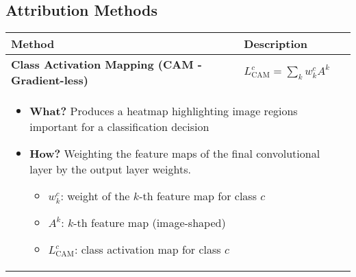 \subsection{Attribution Methods}
\begin{summary}
    \begin{center}
        \begin{tabular}{ll}
            \toprule
            \textbf{Method} & \textbf{Description} \\
            \midrule
            \textbf{Class Activation Mapping (CAM - Gradient-less)} & $L_{\text{CAM}}^c = \sum_k w_k^c A^k$ \\
            \multicolumn{2}{p{\linewidth}}{
            \begin{itemize}
                \item \textbf{What?} Produces a heatmap highlighting image regions important for a classification decision
                \item \textbf{How?} Weighting the feature maps of the final convolutional layer by the output layer weights.
                \begin{itemize}
                    \item $w_k^c$: weight of the $k$-th feature map for class $c$
                    \item $A^k$: $k$-th feature map (image-shaped)
                    \item $L_{\text{CAM}}^c$: class activation map for class $c$
                \end{itemize}
                

\end{itemize}}
\end{tabular}
\end{center}
\end{summary}
